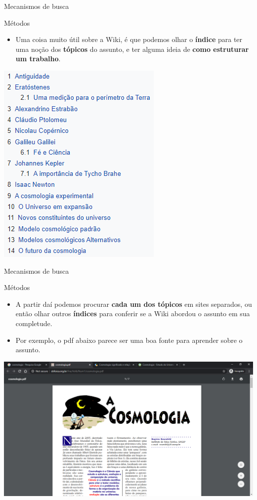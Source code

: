 \begin{frame}{Mecanismos de busca}
	\begin{block}{Métodos}
		\begin{itemize}
			\item Uma coisa muito útil sobre a Wiki, é que podemos olhar o \textbf{índice} para ter uma noção dos \textbf{tópicos} do assunto, e ter alguma ideia de \textbf{como estruturar um trabalho}.
		\end{itemize}
	\end{block}

	\centering
	\includegraphics[width=0.36\linewidth]{Figuras/Ch03/fig7.7}
\end{frame}


\begin{frame}{Mecanismos de busca}
	\begin{block}{Métodos}
		\begin{itemize}
			\item A partir daí podemos procurar \textbf{cada um dos tópicos} em sites separados, ou então olhar outros \textbf{índices} para conferir se a Wiki abordou o assunto em sua completude.
			\item Por exemplo, o pdf abaixo parece ser uma boa fonte para aprender sobre o assunto.
		\end{itemize}
	\end{block}

	\centering
	\includegraphics[width=0.7\linewidth]{Figuras/Ch03/fig7.8}
\end{frame}


